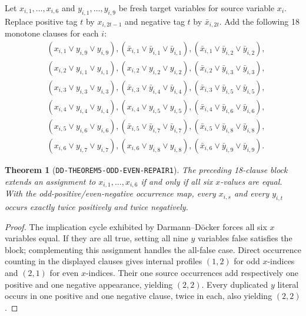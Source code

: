 \documentclass[11pt]{article}
\newtheorem{theorem}{Theorem}
\begin{document}
Let $x_{i,1},\ldots,x_{i,6}$ and $y_{i,1},\ldots,y_{i,9}$ be fresh target
variables for source variable $x_i$.  Replace positive tag $t$ by
$x_{i,2t-1}$ and negative tag $t$ by $\bar x_{i,2t}$.  Add the following
18 monotone clauses for each $i$:
\begin{align*}
&(x_{i,1}\vee y_{i,9}\vee y_{i,9}),
 (\bar x_{i,1}\vee\bar y_{i,1}\vee\bar y_{i,1}),
 (\bar x_{i,1}\vee\bar y_{i,2}\vee\bar y_{i,2}),\\
&(x_{i,2}\vee y_{i,1}\vee y_{i,1}),
 (x_{i,2}\vee y_{i,2}\vee y_{i,2}),
 (\bar x_{i,2}\vee\bar y_{i,3}\vee\bar y_{i,3}),\\
&(x_{i,3}\vee y_{i,3}\vee y_{i,3}),
 (\bar x_{i,3}\vee\bar y_{i,4}\vee\bar y_{i,4}),
 (\bar x_{i,3}\vee\bar y_{i,5}\vee\bar y_{i,5}),\\
&(x_{i,4}\vee y_{i,4}\vee y_{i,4}),
 (x_{i,4}\vee y_{i,5}\vee y_{i,5}),
 (\bar x_{i,4}\vee\bar y_{i,6}\vee\bar y_{i,6}),\\
&(x_{i,5}\vee y_{i,6}\vee y_{i,6}),
 (\bar x_{i,5}\vee\bar y_{i,7}\vee\bar y_{i,7}),
 (\bar x_{i,5}\vee\bar y_{i,8}\vee\bar y_{i,8}),\\
&(x_{i,6}\vee y_{i,7}\vee y_{i,7}),
 (x_{i,6}\vee y_{i,8}\vee y_{i,8}),
 (\bar x_{i,6}\vee\bar y_{i,9}\vee\bar y_{i,9}).
\end{align*}

\begin{theorem}[\texttt{DD-THEOREM5-ODD-EVEN-REPAIR1}]
The preceding 18-clause block extends an assignment to
$x_{i,1},\ldots,x_{i,6}$ if and only if all six $x$-values are equal.  With
the odd-positive/even-negative occurrence map, every $x_{i,s}$ and every
$y_{i,t}$ occurs exactly twice positively and twice negatively.
\end{theorem}
\begin{proof}
The implication cycle exhibited by Darmann--D\"ocker forces all six $x$
variables equal.  If they are all true, setting all nine $y$ variables false
satisfies the block; complementing this assignment handles the all-false
case.  Direct occurrence counting in the displayed clauses gives internal
profiles $(1,2)$ for odd $x$-indices and $(2,1)$ for even $x$-indices.
Their one source occurrences add respectively one positive and one negative
appearance, yielding $(2,2)$.  Every duplicated $y$ literal occurs in one
positive and one negative clause, twice in each, also yielding $(2,2)$.
\end{proof}
\end{document}
